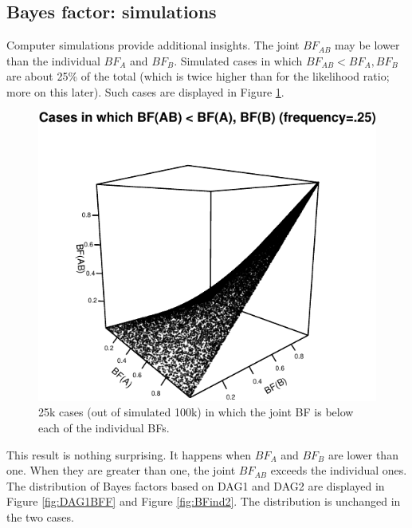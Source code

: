 \documentclass[
  10pt,
  dvipsnames,enabledeprecatedfontcommands]{scrartcl}
\begin{document}
\hypertarget{bayes-factor-simulations}{%
\subsection*{Bayes factor: simulations}\label{bayes-factor-simulations}}

Computer simulations provide additional insights. The joint \(BF_{AB}\)
may be lower than the individual \(BF_A\) and \(BF_B\). Simulated cases
in which \(BF_{AB} < BF_{A}, BF_{B}\) are about 25\% of the total (which
is twice higher than for the likelihood ratio; more on this later). Such
cases are displayed in Figure \ref{fig:BFfails}.

\vspace{1mm}
\footnotesize

\normalsize

\vspace{1mm}
\footnotesize

\normalsize

\begin{figure}

\begin{center}\includegraphics[width=0.7\linewidth]{conjunction-appendix14_files/figure-latex/unnamed-chunk-15-1} \end{center}
\caption{25k cases (out of simulated 100k) in which the joint BF is below each of the individual BFs.}
\label{fig:BFfails}
\end{figure}

This result is nothing surprising. It happens when \(BF_A\) and \(BF_B\)
are lower than one. When they are greater than one, the joint
\(BF_{AB}\) exceeds the individual ones. The distribution of Bayes
factors based on \textsf{DAG1} and \textsf{DAG2} are displayed in Figure
\ref{fig:DAG1BFF} and Figure \ref{fig:BFind2}. The distribution is
unchanged in the two cases.
\end{document}
